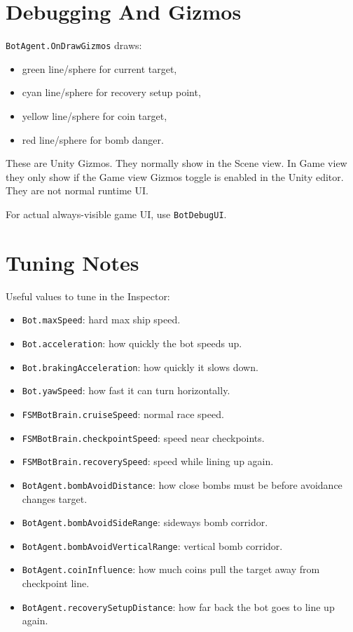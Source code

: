 \documentclass[11pt]{article}
\newcommand{\code}[1]{{\footnotesize\texttt{#1}}}
\begin{document}
\section{Debugging And Gizmos}

\code{BotAgent.OnDrawGizmos} draws:

\begin{itemize}
    \item green line/sphere for current target,
    \item cyan line/sphere for recovery setup point,
    \item yellow line/sphere for coin target,
    \item red line/sphere for bomb danger.
\end{itemize}

These are Unity Gizmos. They normally show in the Scene view. In Game view they only show if the Game view Gizmos toggle is enabled in the Unity editor. They are not normal runtime UI.

For actual always-visible game UI, use \code{BotDebugUI}.

\section{Tuning Notes}

Useful values to tune in the Inspector:

\begin{itemize}
    \item \code{Bot.maxSpeed}: hard max ship speed.
    \item \code{Bot.acceleration}: how quickly the bot speeds up.
    \item \code{Bot.brakingAcceleration}: how quickly it slows down.
    \item \code{Bot.yawSpeed}: how fast it can turn horizontally.
    \item \code{FSMBotBrain.cruiseSpeed}: normal race speed.
    \item \code{FSMBotBrain.checkpointSpeed}: speed near checkpoints.
    \item \code{FSMBotBrain.recoverySpeed}: speed while lining up again.
    \item \code{BotAgent.bombAvoidDistance}: how close bombs must be before avoidance changes target.
    \item \code{BotAgent.bombAvoidSideRange}: sideways bomb corridor.
    \item \code{BotAgent.bombAvoidVerticalRange}: vertical bomb corridor.
    \item \code{BotAgent.coinInfluence}: how much coins pull the target away from checkpoint line.
    \item \code{BotAgent.recoverySetupDistance}: how far back the bot goes to line up again.
\end{itemize}
\end{document}
